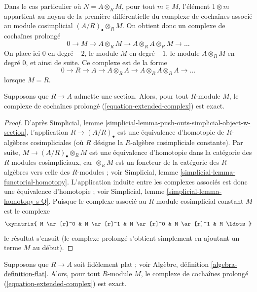 \medskip\noindent
Dans le cas particulier où
$N = A \otimes_R M$, pour tout $m \in M$,
l'élément $1 \otimes m$ appartient au noyau de la première différentielle
du complexe de cochaînes associé au module cosimplicial
$(A/R)_\bullet \otimes_R M$. On obtient donc un complexe de cochaînes prolongé
\begin{equation}
\label{equation-extended-complex}
0 \to M \to A \otimes_R M \to A \otimes_R A \otimes_R M \to \ldots
\end{equation}
On place ici $0$ en degré $-2$,
le module $M$ en degré $-1$, le module $A \otimes_R M$
en degré $0$, et ainsi de suite. Ce complexe est de la forme
$$
0 \to R \to A \to A \otimes_R A \to A \otimes_R A \otimes_R A \to \ldots
$$
lorsque $M = R$.

\begin{lemma}
\label{lemma-with-section-exact}
Supposons que $R \to A$ admette une section.
Alors, pour tout $R$-module $M$, le complexe de cochaînes prolongé
(\ref{equation-extended-complex}) est exact.
\end{lemma}

\begin{proof}
D'après
Simplicial, lemme \ref{simplicial-lemma-push-outs-simplicial-object-w-section},
l'application $R \to (A/R)_\bullet$ est une équivalence d'homotopie
de $R$-algèbres cosimpliciales
(où $R$ désigne la $R$-algèbre cosimpliciale constante).
Par suite, $M \to (A/R)_\bullet \otimes_R M$ est
une équivalence d'homotopie dans la catégorie des
$R$-modules cosimpliciaux, car $\otimes_R M$ est
un foncteur de la catégorie des $R$-algèbres vers celle
des $R$-modules ; voir
Simplicial, lemme \ref{simplicial-lemma-functorial-homotopy}.
L'application induite entre les complexes associés est donc
une équivalence d'homotopie ; voir
Simplicial, lemme \ref{simplicial-lemma-homotopy-s-Q}.
Puisque le complexe associé au $R$-module cosimplicial constant
$M$ est le complexe
$$
\xymatrix{
M \ar[r]^0 & M \ar[r]^1 & M \ar[r]^0 & M \ar[r]^1 & M \ldots
}
$$
le résultat s'ensuit (le complexe prolongé s'obtient simplement en ajoutant
un terme $M$ au début).
\end{proof}

\begin{lemma}
\label{lemma-ff-exact}
Supposons que $R \to A$ soit fidèlement plat ; voir
Algèbre, définition \ref{algebra-definition-flat}.
Alors, pour tout $R$-module $M$, le complexe de cochaînes prolongé
(\ref{equation-extended-complex}) est exact.
\end{lemma}

